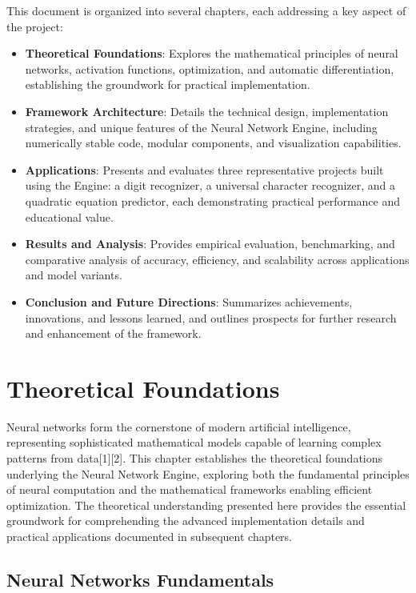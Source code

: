 \documentclass[11pt,a4paper]{report}
\begin{document}
This document is organized into several chapters, each addressing a key aspect of the project:
\begin{itemize}
    \item \textbf{Theoretical Foundations}: Explores the mathematical principles of neural networks, activation functions, optimization, and automatic differentiation, establishing the groundwork for practical implementation.
    \item \textbf{Framework Architecture}: Details the technical design, implementation strategies, and unique features of the Neural Network Engine, including numerically stable code, modular components, and visualization capabilities.
    \item \textbf{Applications}: Presents and evaluates three representative projects built using the Engine: a digit recognizer, a universal character recognizer, and a quadratic equation predictor, each demonstrating practical performance and educational value.
    \item \textbf{Results and Analysis}: Provides empirical evaluation, benchmarking, and comparative analysis of accuracy, efficiency, and scalability across applications and model variants.
    \item \textbf{Conclusion and Future Directions}: Summarizes achievements, innovations, and lessons learned, and outlines prospects for further research and enhancement of the framework.
\end{itemize}

\chapter{Theoretical Foundations}

Neural networks form the cornerstone of modern artificial intelligence, representing sophisticated mathematical models capable of learning complex patterns from data[1][2]. This chapter establishes the theoretical foundations underlying the Neural Network Engine, exploring both the fundamental principles of neural computation and the mathematical frameworks enabling efficient optimization. The theoretical understanding presented here provides the essential groundwork for comprehending the advanced implementation details and practical applications documented in subsequent chapters.

\section{Neural Networks Fundamentals}
\end{document}
